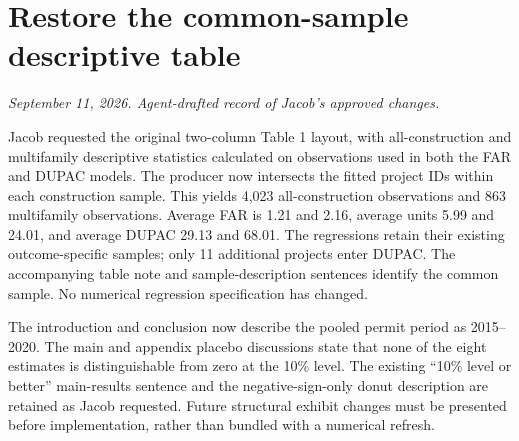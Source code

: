 \section*{Restore the common-sample descriptive table}
\textit{September 11, 2026. Agent-drafted record of Jacob's approved changes.}

Jacob requested the original two-column Table 1 layout, with all-construction
and multifamily descriptive statistics calculated on observations used in both
the FAR and DUPAC models. The producer now intersects the fitted project IDs
within each construction sample. This yields 4,023 all-construction observations
and 863 multifamily observations. Average FAR is 1.21 and 2.16, average units
5.99 and 24.01, and average DUPAC 29.13 and 68.01. The regressions retain their
existing outcome-specific samples; only 11 additional projects enter DUPAC.
The accompanying table note and sample-description sentences identify the common
sample. No numerical regression specification has changed.

The introduction and conclusion now describe the pooled permit period as
2015--2020. The main and appendix placebo discussions state that none of the
eight estimates is distinguishable from zero at the 10\% level. The existing
``10\% level or better'' main-results sentence and the negative-sign-only donut
description are retained as Jacob requested. Future structural exhibit changes
must be presented before implementation, rather than bundled with a numerical
refresh.
